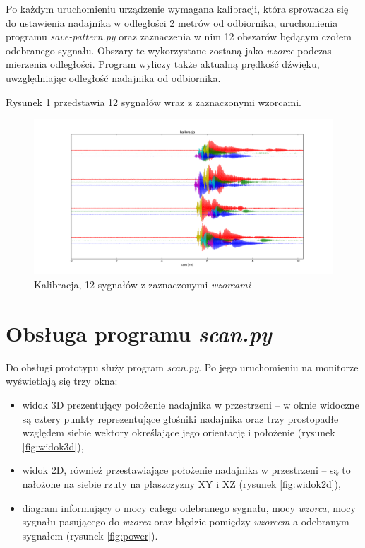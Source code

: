 Po każdym uruchomieniu urządzenie wymagana kalibracji,
która sprowadza się do ustawienia nadajnika w odległości 2 metrów od odbiornika,
uruchomienia programu \textit{save-pattern.py} oraz zaznaczenia w nim 12 obszarów  będącym czołem odebranego sygnału.
Obszary te wykorzystane zostaną jako \textit{wzorce} podczas mierzenia odległości.
Program wyliczy także aktualną prędkość dźwięku, uwzględniając odległość nadajnika od odbiornika.

Rysunek \ref{fig:kalibracja_12x} przedstawia 12 sygnałów wraz z zaznaczonymi wzorcami.


 \begin{figure}[ht]
    \centering
    \includegraphics[width=1.0\textwidth, trim= 50mm 0mm 40mm 0mm,clip]{kalibracja_12x}
    \caption{Kalibracja, 12 sygnałów z zaznaczonymi \textit{wzorcami}}
    \label{fig:kalibracja_12x}
\end{figure}

\newpage

\section{Obsługa programu \textit{scan.py}}

Do obsługi prototypu służy program \textit{scan.py}. Po jego uruchomieniu 
na monitorze wyświetlają się trzy okna: 
\begin{itemize}
 \item widok 3D prezentujący położenie nadajnika w przestrzeni -- w oknie widoczne są  
 cztery punkty reprezentujące głośniki nadajnika oraz trzy prostopadłe względem siebie wektory określające 
jego orientację i położenie (rysunek \ref{fig:widok3d}),
 \item widok 2D, również przestawiające położenie nadajnika w przestrzeni --
 są to nałożone na siebie rzuty na płaszczyzny XY i XZ
 (rysunek \ref{fig:widok2d}),
 \item diagram informujący o mocy całego odebranego sygnału, mocy \textit{wzorca}, mocy sygnału pasującego do \textit{wzorca} 
 oraz błędzie pomiędzy \textit{wzorcem} a odebranym sygnałem (rysunek \ref{fig:power}).
\end{itemize}

